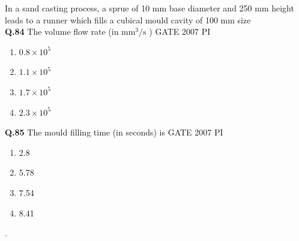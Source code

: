 \documentclass[journal,12pt,onecolumn]{exam}
\theoremstyle{remark}
\begin{document}
 In a sand casting process, a sprue of 10 mm base diameter and 250 mm height leads to a runner which fills a cubical mould cavity of 100 mm size\\
 
 \noindent
\textbf{Q.84}
The volume flow rate (in $\mathrm{mm}^3/\mathrm{s}$
)
\hfill{GATE 2007 PI}
\begin{enumerate}
\item $0.8 \times 10^{5}$
\item $1.1 \times 10^{5}$
\item $1.7 \times 10^{5}$
\item $2.3 \times 10^{5}$
\end{enumerate}
\noindent
\textbf{Q.85}
The mould filling time (in seconds) is
\hfill{GATE 2007 PI}
\begin{enumerate}
    \item 2.8
    \item 5.78
    \item 7.54
    \item 8.41
\end{enumerate}


.
   





    
\end{document}
